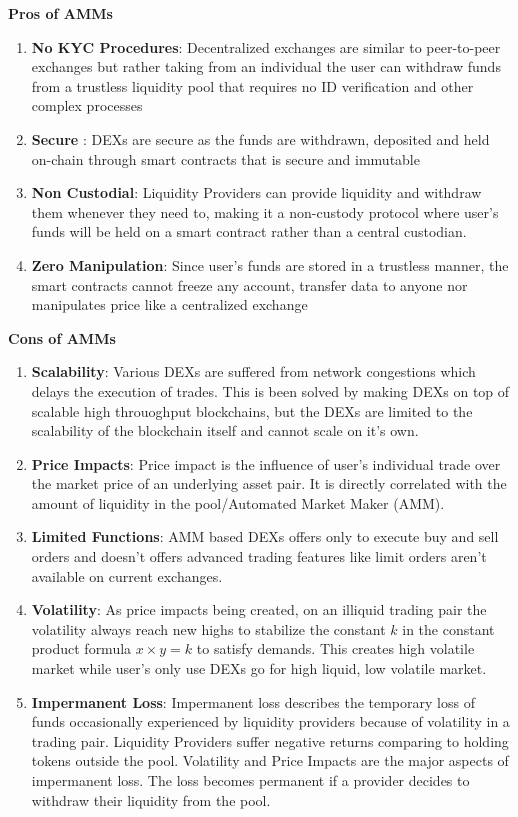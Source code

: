 \documentclass[letterpaper,11pt]{article}
\begin{document}
\textbf{Pros of AMMs}
\begin{enumerate}[wide, labelwidth=!, labelindent=0pt]
\item \textbf{No KYC Procedures}: Decentralized exchanges are similar to peer-to-peer exchanges but rather taking from an individual the user can withdraw funds from a trustless liquidity pool that requires no ID verification and other complex processes
\item \textbf{Secure} : DEXs are secure as the funds are withdrawn, deposited and held on-chain through smart contracts that is secure and immutable
\item \textbf{Non Custodial}: Liquidity Providers can provide liquidity and withdraw them whenever they need to, making it a non-custody protocol where user's funds will be held on a smart contract rather than a central custodian.
\item \textbf{Zero Manipulation}: Since user's funds are stored in a trustless manner, the smart contracts cannot freeze any account, transfer data to anyone nor manipulates price like a centralized exchange
\end{enumerate}

\textbf{Cons of AMMs}
\begin{enumerate}[wide, labelwidth=!, labelindent=0pt]
\item \textbf{Scalability}: Various DEXs are suffered from network congestions which delays the execution of trades. This is been solved by making DEXs on top of scalable high throuoghput blockchains, but the DEXs are limited to the scalability of the blockchain itself and cannot scale on it's own.
\item \textbf{Price Impacts}: Price impact is the influence of user's individual trade over the market price of an underlying asset pair. It is directly correlated with the amount of liquidity in the pool/Automated Market Maker (AMM).
\item \textbf{Limited Functions}: AMM based DEXs offers only to execute buy and sell orders and doesn't offers advanced trading features like limit orders aren't available on current exchanges.
\item \textbf{Volatility}: As price impacts being created, on an illiquid trading pair the volatility always reach new highs to stabilize the constant $k$ in the constant product formula $x \times  y=k$ to satisfy demands. This creates high volatile market while user's only use DEXs go for high liquid, low volatile market.
\item \textbf{Impermanent Loss}: Impermanent loss describes the temporary loss of funds occasionally experienced by liquidity providers because of volatility in a trading pair. Liquidity Providers suffer negative returns comparing to holding tokens outside the pool. Volatility and Price Impacts are the major aspects of impermanent loss. The loss becomes permanent if a provider decides to withdraw their liquidity from the pool.
\end{enumerate}
\end{document}
